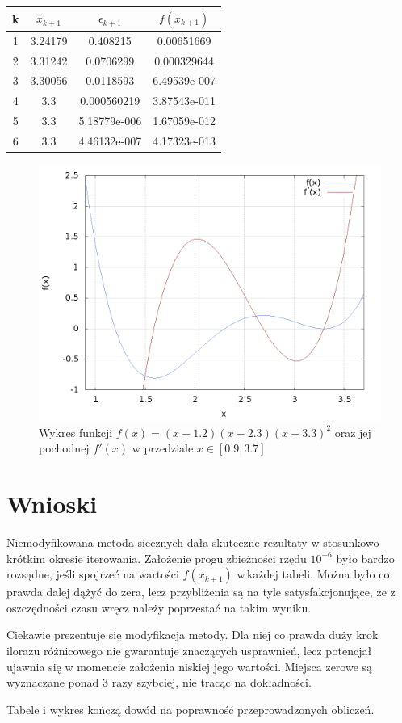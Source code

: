 \begin{table}[!htp]
\hfill
	\centering
	\begin{tabular}{|c|c|c|c|}
		\hline
		k&$x_{k+1}$&$\epsilon_{k+1} $&$ f(x_{k+1})$ \\ \hline
		1&3.24179&0.408215&0.00651669 \\ \hline
		2&3.31242&0.0706299&0.000329644 \\ \hline
		3&3.30056&0.0118593&6.49539e-007 \\ \hline
		4&3.3&0.000560219&3.87543e-011 \\ \hline
		5&3.3&5.18779e-006&1.67059e-012 \\ \hline
		6&3.3&4.46132e-007&4.17323e-013 \\ \hline
	\end{tabular}
\end{table}
\begin{figure}[h!]
	\begin{center}
		\includegraphics[height=0.4\linewidth]{funkcje.png}
		\caption{Wykres funkcji $ f(x) = (x-1.2)(x-2.3)(x-3.3)^2$ oraz jej pochodnej $ f'(x) $ w przedziale $ x \in [0.9,3.7] $}
		\label{funkcje}
	\end{center}
\end{figure}

\newpage
\section{Wnioski}

Niemodyfikowana metoda siecznych dała skuteczne rezultaty w stosunkowo krótkim okresie iterowania. Założenie progu zbieżności rzędu $ 10^{-6} $ było bardzo rozsądne, jeśli spojrzeć na wartości $ f(x_{k+1}) $ w\,każdej tabeli. Można było co prawda dalej dążyć do zera, lecz przybliżenia są na tyle satysfakcjonujące, że z oszczędności czasu wręcz należy poprzestać na takim wyniku.

Ciekawie prezentuje się modyfikacja metody. Dla niej co prawda duży krok ilorazu różnicowego nie gwarantuje znaczących usprawnień, lecz potencjał ujawnia się w momencie założenia niskiej jego wartości. Miejsca zerowe są wyznaczane ponad 3 razy szybciej, nie tracąc na dokładności.

Tabele i wykres kończą dowód na poprawność przeprowadzonych obliczeń.

